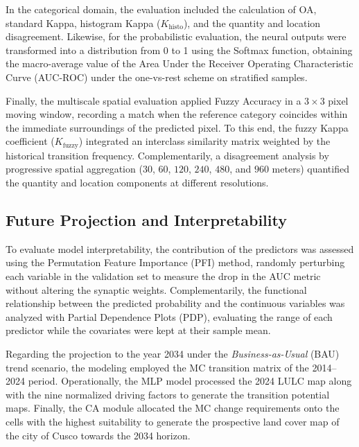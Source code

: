 \documentclass[runningheads]{llncs}
\begin{document}
In the categorical domain, the evaluation included the calculation of OA, standard Kappa, histogram Kappa ($K_{\text{histo}}$), and the quantity and location disagreement. Likewise, for the probabilistic evaluation, the neural outputs were transformed into a distribution from 0 to 1 using the Softmax function, obtaining the macro-average value of the Area Under the Receiver Operating Characteristic Curve (AUC-ROC) under the one-vs-rest scheme on stratified samples.

Finally, the multiscale spatial evaluation applied Fuzzy Accuracy in a $3 \times 3$ pixel moving window, recording a match when the reference category coincides within the immediate surroundings of the predicted pixel. To this end, the fuzzy Kappa coefficient ($K_{\text{fuzzy}}$) integrated an interclass similarity matrix weighted by the historical transition frequency. Complementarily, a disagreement analysis by progressive spatial aggregation ($30$, $60$, $120$, $240$, $480$, and $960$ meters) quantified the quantity and location components at different resolutions.

\subsection{Future Projection and Interpretability}
\label{subsec:proyeccion_futura_interpretabilidad}

To evaluate model interpretability, the contribution of the predictors was assessed using the Permutation Feature Importance (PFI) method, randomly perturbing each variable in the validation set to measure the drop in the AUC metric without altering the synaptic weights. Complementarily, the functional relationship between the predicted probability and the continuous variables was analyzed with Partial Dependence Plots (PDP), evaluating the range of each predictor while the covariates were kept at their sample mean.

Regarding the projection to the year 2034 under the \textit{Business-as-Usual} (BAU) trend scenario, the modeling employed the MC transition matrix of the 2014--2024 period. Operationally, the MLP model processed the 2024 LULC map along with the nine normalized driving factors to generate the transition potential maps. Finally, the CA module allocated the MC change requirements onto the cells with the highest suitability to generate the prospective land cover map of the city of Cusco towards the 2034 horizon.
\end{document}
